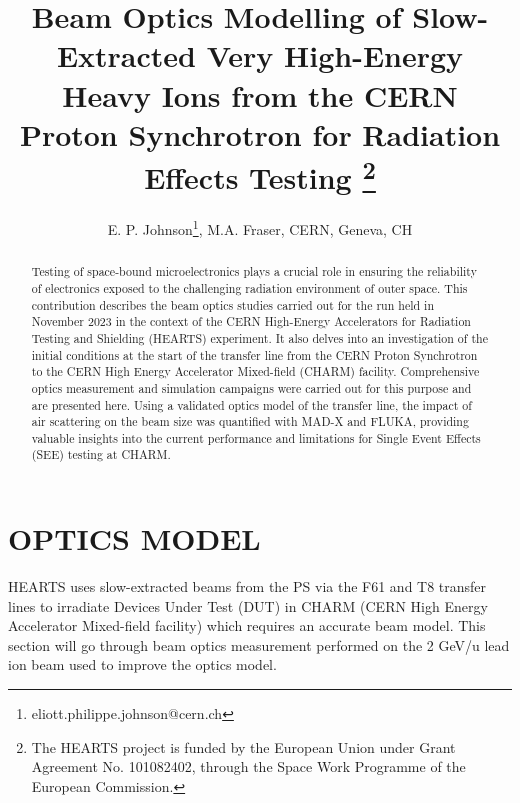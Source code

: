 \documentclass[a4paper,
               biblatex,     %
               ]{jacow}
\begin{document}
\title{Beam Optics Modelling of Slow-Extracted Very High-Energy Heavy Ions from the CERN Proton Synchrotron for Radiation Effects Testing \thanks{The HEARTS project is funded by the European Union under Grant Agreement No. 101082402, through the Space Work Programme of the European Commission.}}

\author{E. P. Johnson\thanks{eliott.philippe.johnson@cern.ch}, M.A. Fraser, CERN, Geneva, CH}
	
\maketitle

%
\begin{abstract}
   Testing of space-bound microelectronics plays a crucial role in ensuring the reliability of electronics exposed to the challenging radiation environment of outer space. This contribution describes the beam optics studies carried out for the run held in November 2023 in the context of the CERN High-Energy Accelerators for Radiation Testing and Shielding (HEARTS) experiment. It also delves into an investigation of the initial conditions at the start of the transfer line from the CERN Proton Synchrotron to the CERN High Energy Accelerator Mixed-field (CHARM) facility. Comprehensive optics measurement and simulation campaigns were carried out for this purpose and are presented here. Using a validated optics model of the transfer line, the impact of air scattering on the beam size was quantified with MAD-X and FLUKA, providing valuable insights into the current performance and limitations for Single Event Effects (SEE) testing at CHARM.
\end{abstract}







\section{OPTICS MODEL}

HEARTS uses slow-extracted beams from the PS via the F61 and T8 transfer lines to irradiate Devices Under Test (DUT) in CHARM (CERN High Energy Accelerator Mixed-field facility) which requires an accurate beam model. This section will go through beam optics measurement performed on the 2 GeV/u lead ion beam used to improve the optics model.
\end{document}
